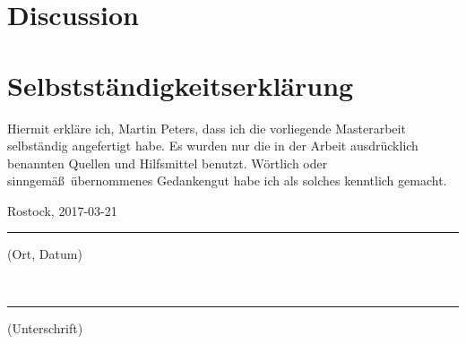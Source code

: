 \documentclass[12pt, a4paper, titlepage, oneside, final]{book}
\newcommand{\thedate}{2017-03-21}					%
\begin{document}
	\chapter{Discussion}
	\label{sec:discussion}
	
	
	
	\newpage
	
	\chapter*{Selbstständigkeitserklärung}
	Hiermit erkläre ich, Martin Peters, dass ich die vorliegende Masterarbeit selbständig angefertigt habe. Es wurden nur die in der Arbeit ausdrücklich benannten Quellen und Hilfsmittel benutzt. Wörtlich oder sinngemä\ss \ übernommenes Gedankengut habe ich als solches kenntlich gemacht.
	
	\vspace{15mm}
	
	\hfil
	\begin{minipage}[t]{55mm}
		\centering
		Rostock, \thedate\\
		\vspace{-1.9em}
		\rule[-8pt]{\textwidth}{0.5pt}
		{\footnotesize (Ort, Datum)}
	\end{minipage}
	\hfil\hfil
	\begin{minipage}[t]{55mm}
		\centering
		\ \\
		\vspace{-1.9em}
		\rule[-8pt]{\textwidth}{0.5pt}
		{\footnotesize (Unterschrift)}
	\end{minipage}

	\newpage
	
	\printbibliography[heading=bibintoc]
	
	\newpage
	
	
	\printglossary[type=\acronymtype]
	\printglossary[type=main]
	
	\begin{appendices}
		\noappendicestocpagenum
		
		\label{sec:appendix}
		
	\end{appendices}
\end{document}
